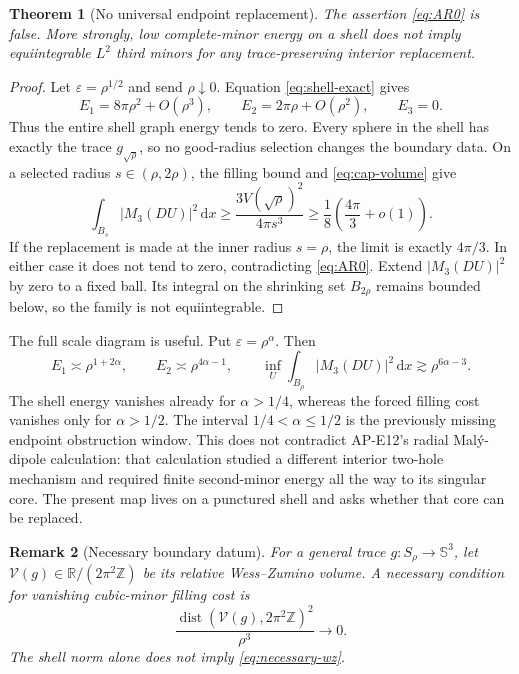 \documentclass[11pt]{article}
\newtheorem{theorem}{Theorem}[section]
\newtheorem{remark}[theorem]{Remark}
\newcommand{\dd}{\,\mathrm d}
\newcommand{\RR}{\mathbb R}
\newcommand{\SSS}{\mathbb S}
\newcommand{\dist}{\operatorname{dist}}
\begin{document}
\begin{theorem}[No universal endpoint replacement]
The assertion \eqref{eq:AR0} is false.  More strongly, low complete-minor
energy on a shell does not imply equiintegrable $L^2$ third minors for any
trace-preserving interior replacement.
\end{theorem}

\begin{proof}
Let $\varepsilon=\rho^{1/2}$ and send $\rho\downarrow0$.  Equation
\eqref{eq:shell-exact} gives
\begin{equation}
 E_1=8\pi\rho^2+O(\rho^3),\qquad
 E_2=2\pi\rho+O(\rho^2),\qquad E_3=0.
 \label{eq:critical-shell}
\end{equation}
Thus the entire shell graph energy tends to zero.  Every sphere in the shell
has exactly the trace $g_{\sqrt\rho}$, so no good-radius selection changes
the boundary data.  On a selected radius $s\in(\rho,2\rho)$, the filling
bound and \eqref{eq:cap-volume} give
\begin{equation}
 \int_{B_s}|M_3(DU)|^2\dd x
 \geq\frac{3V(\sqrt\rho)^2}{4\pi s^3}
 \geq \frac{1}{8}\left(\frac{4\pi}{3}+o(1)\right).
 \label{eq:selected-radius-bound}
\end{equation}
If the replacement is made at the inner radius $s=\rho$, the limit is
exactly $4\pi/3$.  In either case it does not tend to zero, contradicting
\eqref{eq:AR0}.  Extend $|M_3(DU)|^2$ by zero to a fixed ball.  Its integral
on the shrinking set $B_{2\rho}$ remains bounded below, so the family is not
equiintegrable.
\end{proof}

The full scale diagram is useful.  Put $\varepsilon=\rho^\alpha$.  Then
\begin{equation}
 E_1\asymp\rho^{1+2\alpha},\qquad
 E_2\asymp\rho^{4\alpha-1},\qquad
 \inf_U\int_{B_\rho}|M_3(DU)|^2\dd x
 \gtrsim\rho^{6\alpha-3}.
 \label{eq:alpha-diagram}
\end{equation}
The shell energy vanishes already for $\alpha>1/4$, whereas the forced
filling cost vanishes only for $\alpha>1/2$.  The interval
$1/4<\alpha\leq1/2$ is the previously missing endpoint obstruction window.
This does not contradict AP-E12's radial Mal\'y-dipole calculation: that
calculation studied a different interior two-hole mechanism and required
finite second-minor energy all the way to its singular core.  The present map
lives on a punctured shell and asks whether that core can be replaced.

\begin{remark}[Necessary boundary datum]
For a general trace $g:S_\rho\to\SSS^3$, let
$\mathcal V(g)\in\RR/(2\pi^2\mathbb Z)$ be its relative Wess--Zumino volume.
A necessary condition for vanishing cubic-minor filling cost is
\begin{equation}
 \frac{\dist(\mathcal V(g),2\pi^2\mathbb Z)^2}{\rho^3}\longrightarrow0.
 \label{eq:necessary-wz}
\end{equation}
The shell norm alone does not imply \eqref{eq:necessary-wz}.
\end{remark}
\end{document}
